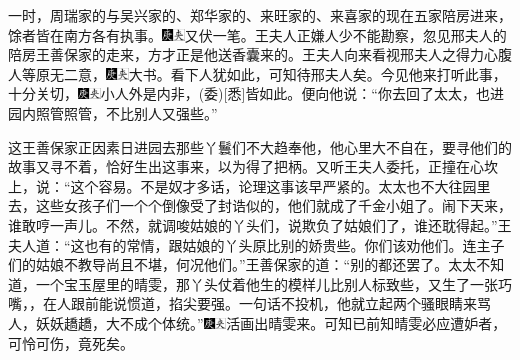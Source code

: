 一时，周瑞家的与吴兴家的、郑华家的、来旺家的、来喜家的现在五家陪房进来，馀者皆在南方各有执事。{\includegraphics[width=3mm]{../Images/00004}\includegraphics[width=3mm]{../Images/00012}\footnotesize \kaishu 又伏一笔。}王夫人正嫌人少不能勘察，忽见邢夫人的陪房王善保家的走来，方才正是他送香囊来的。王夫人向来看视邢夫人之得力心腹人等原无二意，{\includegraphics[width=3mm]{../Images/00004}\includegraphics[width=3mm]{../Images/00012}\footnotesize \kaishu 大书。看下人犹如此，可知待邢夫人矣。}今见他来打听此事，十分关切，{\includegraphics[width=3mm]{../Images/00004}\includegraphics[width=3mm]{../Images/00012}\footnotesize \kaishu 小人外是内非，{(委)}{[}悉{]}皆如此。}便向他说：``你去回了太太，也进园内照管照管，不比别人又强些。''

这王善保家正因素日进园去那些丫鬟们不大趋奉他，他心里大不自在，要寻他们的故事又寻不着，恰好生出这事来，以为得了把柄。又听王夫人委托，正撞在心坎上，说：``这个容易。不是奴才多话，论理这事该早严紧的。太太也不大往园里去，这些女孩子们一个个倒像受了封诰似的，他们就成了千金小姐了。闹下天来，谁敢哼一声儿。不然，就调唆姑娘的丫头们，说欺负了姑娘们了，谁还耽得起。''王夫人道：``这也有的常情，跟姑娘的丫头原比别的娇贵些。你们该劝他们。连主子们的姑娘不教导尚且不堪，何况他们。''王善保家的道：``别的都还罢了。太太不知道，一个宝玉屋里的晴雯，那丫头仗着他生的模样儿比别人标致些，又生了一张巧嘴，，在人跟前能说惯道，掐尖要强。一句话不投机，他就立起两个骚眼睛来骂人，妖妖趫趫，大不成个体统。''{\includegraphics[width=3mm]{../Images/00004}\includegraphics[width=3mm]{../Images/00012}\footnotesize \kaishu 活画出晴雯来。可知已前知晴雯必应遭妒者，可怜可伤，竟死矣。}


